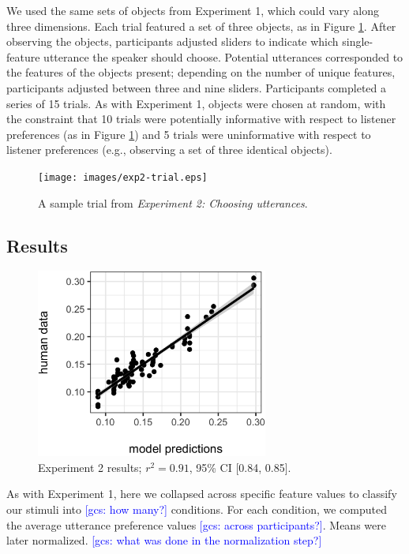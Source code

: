\documentclass[10pt,a4paper]{article}
\newcommand{\gcs}[1]{\textcolor{blue}{[gcs: #1]}}
\begin{document}
We used the same sets of objects from Experiment 1, which could vary along three dimensions. Each trial featured a set of three objects, as in Figure \ref{exp2-trial}. After observing the objects, participants adjusted sliders to indicate which single-feature utterance the speaker should choose. Potential utterances corresponded to the features of the objects present; depending on the number of unique features, participants adjusted between three and nine sliders. Participants completed a series of 15 trials. As with Experiment 1, objects were chosen at random, with the constraint that 10 trials were potentially informative with respect to listener preferences (as in Figure \ref{exp2-trial}) and 5 trials were uninformative with respect to listener preferences (e.g., observing a set of three identical objects). 

\begin{figure}[ht]
	\centering
	\texttt{[image: images/exp2-trial.eps]}
	\caption{A sample trial from \emph{Experiment 2: Choosing utterances}.}\label{exp2-trial}
\end{figure}

\subsection{Results}

\begin{figure}[ht]
	\centering
	\includegraphics[width=3in]{images/X3-scatter-CogSci.eps}
	\caption{Experiment 2 results; $r^{2}=0.91$, 95\% CI [0.84, 0.85].}\label{exp2-results}
\end{figure}


As with Experiment 1, here we collapsed across specific feature values to classify our stimuli into \gcs{how many?} conditions. For each condition, we computed the average utterance preference values \gcs{across participants?}. Means were later normalized. \gcs{what was done in the normalization step?}
\end{document}
